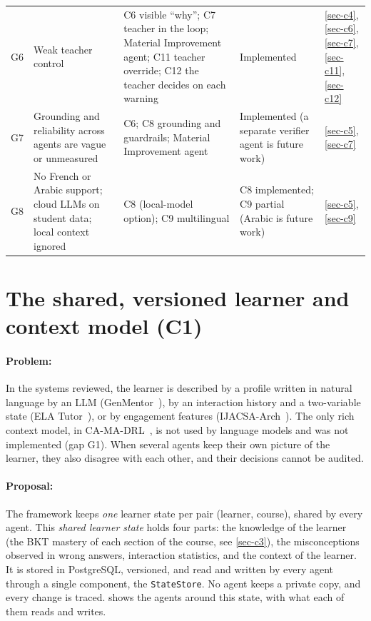 \begin{table}[htbp]
\begin{tabularx}{\textwidth}{@{}L{1.0cm}YL{3.0cm}L{2.6cm}L{1.3cm}@{}}
G6 & Weak teacher control & C6 visible ``why''; C7 teacher in the loop;
  Material Improvement agent; C11 teacher override; C12 the teacher decides on each warning &
  Implemented & \ref{sec-c4}, \ref{sec-c6}, \ref{sec-c7}, \ref{sec-c11}, \ref{sec-c12} \\
G7 & Grounding and reliability across agents are vague or unmeasured &
  C6; C8 grounding and guardrails; Material Improvement agent &
  Implemented (a separate verifier agent is future work) &
  \ref{sec-c5}, \ref{sec-c7} \\
G8 & No French or Arabic support; cloud LLMs on student data; local context ignored &
  C8 (local-model option); C9 multilingual & C8 implemented; C9 partial (Arabic is future work) &
  \ref{sec-c5}, \ref{sec-c9} \\
\bottomrule
\end{tabularx}
\end{table}

\section[The shared learner and context model]{The shared, versioned learner and context model (C1)}
\label{sec-c1}

\paragraph{Problem:} In the systems reviewed, the learner is described by
a profile written in natural language by an LLM
(GenMentor~\cite{wang2025genmentor}), by an interaction history and a
two-variable state (ELA Tutor~\cite{lopezgoyez2026ela}), or by engagement
features (IJACSA-Arch~\cite{khaddar2026ijacsa}). The only rich context
model, in CA-MA-DRL~\cite{sharif2026camadrl}, is not used by language
models and was not implemented (gap G1). When several agents keep their
own picture of the learner, they also disagree with each other, and their
decisions cannot be audited.

\paragraph{Proposal:} The framework keeps \emph{one} learner state per
pair (learner, course), shared by every agent. This \emph{shared learner
state} holds four parts: the knowledge of the learner (the BKT mastery of
each section of the course, see \cref{sec-c3}), the misconceptions
observed in wrong answers, interaction statistics, and the context of the
learner. It is stored in PostgreSQL, versioned, and read and written by
every agent through a single component, the \texttt{StateStore}. No agent
keeps a private copy, and every change is traced.
 shows the agents around this state, with what each
of them reads and writes.

